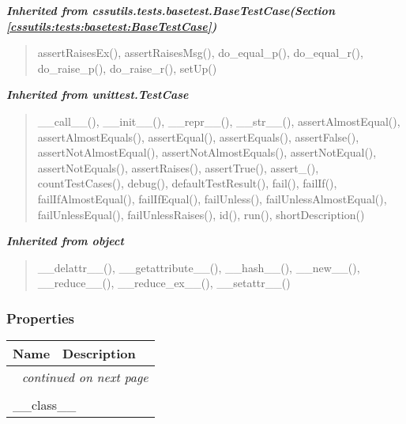 \large{\textbf{\textit{Inherited from cssutils.tests.basetest.BaseTestCase\textit{(Section \ref{cssutils:tests:basetest:BaseTestCase})}}}}

\begin{quote}
assertRaisesEx(), assertRaisesMsg(), do\_equal\_p(), do\_equal\_r(), do\_raise\_p(), do\_raise\_r(), setUp()
\end{quote}

\large{\textbf{\textit{Inherited from unittest.TestCase}}}

\begin{quote}
\_\_call\_\_(), \_\_init\_\_(), \_\_repr\_\_(), \_\_str\_\_(), assertAlmostEqual(), assertAlmostEquals(), assertEqual(), assertEquals(), assertFalse(), assertNotAlmostEqual(), assertNotAlmostEquals(), assertNotEqual(), assertNotEquals(), assertRaises(), assertTrue(), assert\_(), countTestCases(), debug(), defaultTestResult(), fail(), failIf(), failIfAlmostEqual(), failIfEqual(), failUnless(), failUnlessAlmostEqual(), failUnlessEqual(), failUnlessRaises(), id(), run(), shortDescription()
\end{quote}

\large{\textbf{\textit{Inherited from object}}}

\begin{quote}
\_\_delattr\_\_(), \_\_getattribute\_\_(), \_\_hash\_\_(), \_\_new\_\_(), \_\_reduce\_\_(), \_\_reduce\_ex\_\_(), \_\_setattr\_\_()
\end{quote}


  \subsubsection{Properties}

    \vspace{-1cm}
\hspace{\varindent}\begin{longtable}{|p{\varnamewidth}|p{\vardescrwidth}|l}
\cline{1-2}
\cline{1-2} \centering \textbf{Name} & \centering \textbf{Description}& \\
\cline{1-2}
\endhead\cline{1-2}\multicolumn{3}{r}{\small\textit{continued on next page}}\\\endfoot\cline{1-2}
\endlastfoot\multicolumn{2}{|l|}{\textit{Inherited from object}}\\
\multicolumn{2}{|p{\varwidth}|}{\raggedright \_\_class\_\_}\\
\cline{1-2}
\end{longtable}

